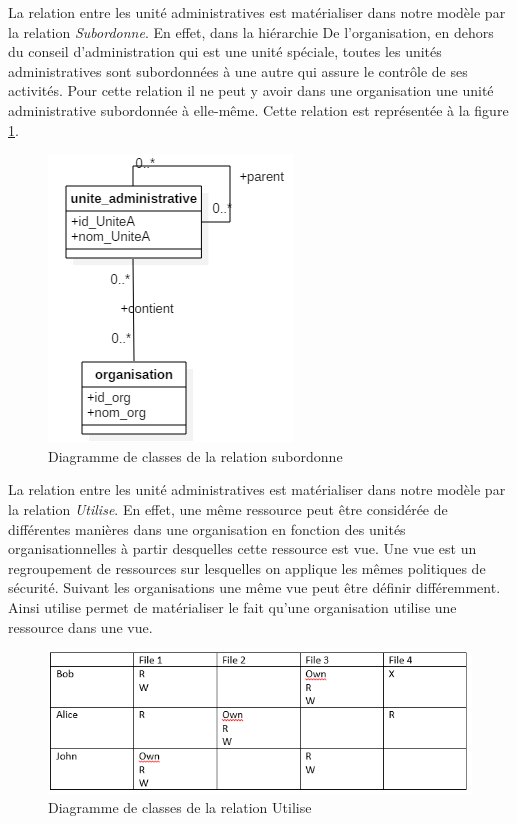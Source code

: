 La relation entre les unité administratives est matérialiser dans  notre modèle par la relation \textit{Subordonne}. En effet, dans la hiérarchie De l'organisation, en dehors du conseil d'administration qui est une unité spéciale, toutes les unités administratives sont  subordonnées à une autre qui assure le contrôle de ses activités. Pour cette relation il ne peut y avoir dans une organisation une unité administrative subordonnée à elle-même. Cette relation est représentée à la figure \ref{figsubordonne}.

\begin{figure}[h!]
    \centering
		\includegraphics[scale=0.7]{chap3/images/subordonne.png}
    \caption{Diagramme de classes de la relation subordonne}
	 \label{figsubordonne}
\end{figure} 

\label{sectionRessourceetVue}

La relation entre les unité administratives est matérialiser dans  notre modèle par la relation \textit{Utilise}. En effet, une même ressource peut être considérée de différentes manières dans une organisation en fonction des unités organisationnelles à partir desquelles cette ressource est vue. Une vue est un regroupement de ressources sur lesquelles on applique les mêmes politiques de sécurité. Suivant les organisations une même vue peut être définir différemment. Ainsi utilise permet de matérialiser le fait qu'une organisation utilise une ressource dans une vue.

\begin{figure}[h!]
    \centering
		\includegraphics[scale=0.7]{chap2/images/ACM.png}
    \caption{Diagramme de classes de la relation Utilise}
	 \label{figAcm}
\end{figure} 

